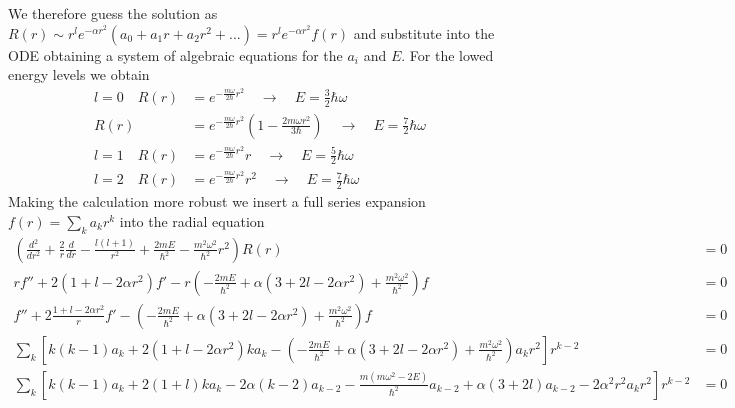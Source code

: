 \documentclass[../main.tex]{subfiles}
\begin{document}
\begin{enumerate}[(a)]
We therefore guess the solution as $R(r)\sim r^le^{-\alpha r^2}(a_0+a_1 r+a_2 r^2+...)= r^le^{-\alpha r^2}f(r)$ and substitute into the ODE obtaining a system of algebraic equations for the $a_i$ and $E$. For the lowed energy levels we obtain
\begin{align}
l=0\quad
R(r)&=e^{-\frac{m\omega}{2\hbar}r^2}\quad\rightarrow\quad E=\frac{3}{2}\hbar\omega\\
R(r)&=e^{-\frac{m\omega}{2\hbar}r^2}\left(1-\frac{2m\omega r^2}{3\hbar}\right)\quad\rightarrow\quad E=\frac{7}{2}\hbar\omega\\
l=1\quad
R(r)&=e^{-\frac{m\omega}{2\hbar}r^2}r\quad\rightarrow\quad E=\frac{5}{2}\hbar\omega\\
l=2\quad
R(r)&=e^{-\frac{m\omega}{2\hbar}r^2}r^2\quad\rightarrow\quad E=\frac{7}{2}\hbar\omega
\end{align}
Making the calculation more robust we insert a full series expansion $f(r)=\sum_ka_kr^k$ into the radial equation
\begin{align*}
\left(\frac{d^2}{dr^2}+\frac{2}{r}\frac{d}{dr}-\frac{l(l+1)}{r^2}+\frac{2mE}{\hbar^2}-\frac{m^2\omega^2}{\hbar^2}r^2\right)R(r)&=0\\
rf''+2(1+l-2\alpha r^2)f'-r\left(-\frac{2mE}{\hbar^2}+\alpha(3+2l-2\alpha r^2)+\frac{m^2\omega^2}{\hbar^2}\right)f&=0\\
f''+2\frac{1+l-2\alpha r^2}{r}f'-\left(-\frac{2mE}{\hbar^2}+\alpha(3+2l-2\alpha r^2)+\frac{m^2\omega^2}{\hbar^2}\right)f&=0\\
\sum_k\left[k(k-1)a_k+2(1+l-2\alpha r^2)ka_k-\left(-\frac{2mE}{\hbar^2}+\alpha(3+2l-2\alpha r^2)+\frac{m^2\omega^2}{\hbar^2}\right)a_kr^2\right]r^{k-2}&=0\\
\sum_k\left[k(k-1)a_k+2(1+l)ka_k-2\alpha (k-2)a_{k-2}-\frac{m(m\omega^2-2E)}{\hbar^2}a_{k-2}+\alpha(3+2l)a_{k-2}-2\alpha^2 r^2a_kr^2\right]r^{k-2}&=0\\
\end{align*}


\end{enumerate}
\end{document}
